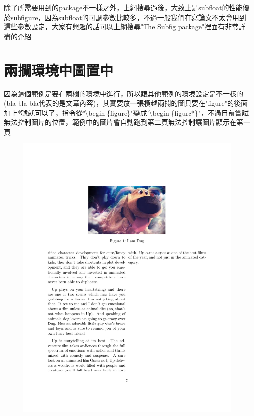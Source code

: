 \documentclass[12pt,a4paper]{report}
\begin{document}
\begin{CJK}{UTF8}{bkai}
\begin{itemize}
除了所需要用到的package不一樣之外，上網搜尋過後，大致上是subfloat的性能優於subfigure，因為subfloat的可調參數比較多，不過一般我們在寫論文不太會用到這些參數設定，大家有興趣的話可以上網搜尋"The Subfig package"裡面有非常詳盡的介紹
\end{itemize}

\section{兩攔環境中圖置中}
\noindent 因為這個範例是要在兩欄的環境中進行，所以跟其他範例的環境設定是不一樣的(bla bla bla代表的是文章內容)，其實要放一張橫越兩攔的圖只要在"figure"的後面加上*號就可以了，指令從"\textbackslash begin \{figure\}"變成"\textbackslash begin \{figure*\}"，不過目前嘗試無法控制圖片的位置，範例中的圖片會自動跑到第二頁無法控制讓圖片顯示在第一頁
\begin{figure}[!h] 
\begin{minipage}[b]{0.5\textwidth} 
\centering 
\includegraphics[scale=0.3]{./pics/twocolumn_figure_example.pdf} 

\end{minipage}
\end{figure}
\end{CJK}
\end{document}
